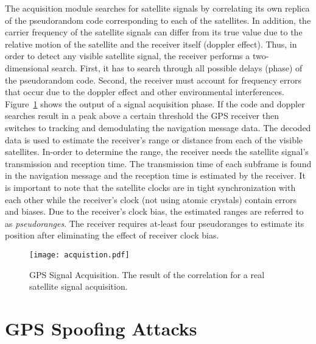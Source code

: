 \documentclass[letterpaper,twocolumn,10pt]{article}
\begin{document}
The acquisition module searches for satellite signals by correlating its own replica of the pseudorandom code corresponding to each of the satellites. In addition, the carrier frequency of the satellite signals can differ from its true value due to the relative motion of the satellite and the receiver itself (doppler effect). Thus, in order to detect any visible satellite signal, the receiver performs a two-dimensional search. First, it has to search through all possible delays (phase) of the pseudorandom code. Second, the receiver must account for frequency errors that occur due to the doppler effect and other environmental interferences. Figure~\ref{fig:acquisition} shows the output of a signal acquisition phase. If the code and doppler searches result in a peak above a certain threshold the GPS receiver then switches to tracking and demodulating the navigation message data. The decoded data is used to estimate the receiver's range or distance from each of the visible satellites. In-order to determine the range, the receiver needs the satellite signal's transmission and reception time. The transmission time of each subframe is found in the navigation message and the reception time is estimated by the receiver. It is important to note that the satellite clocks are in tight synchronization with each other while the receiver's clock (not using atomic crystals) contain errors and biases. Due to the receiver's clock bias, the estimated ranges are referred to as \emph{pseudoranges}. The receiver requires at-least four pseudoranges to estimate its position after eliminating the effect of receiver clock bias.






\begin{figure}[t]
  \texttt{[image: acquistion.pdf]}
  \caption{GPS Signal Acquisition. The result of the correlation for a real satellite signal acquisition.}
  \label{fig:acquisition}
\end{figure}


\section{GPS Spoofing Attacks}
\label{sec:gps-spoofing-attack}
\end{document}
